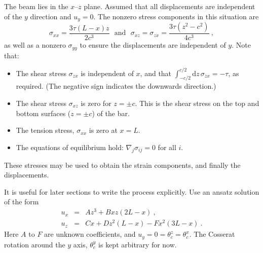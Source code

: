 \documentclass[]{scrreprt}
\begin{document}
The beam lies in the $x$--$z$ plane.  Assumed that all displacements
are independent of the $y$ direction and $u_{y}=0$.  The nonzero
stress components in this situation are
\begin{equation}
\sigma_{xx} = \frac{3\tau (L-x)z}{2c^{3}} \ \ \ \mbox{and}
\ \ \ \sigma_{xz} = \sigma_{zx} = \frac{3\tau(z^{2}-c^{2})}{4c^{3}} \ ,
\end{equation}
as well as a nonzero $\sigma_{yy}$ to ensure the displacements are
independent of $y$.  Note that:
\begin{itemize}
\item The shear stress $\sigma_{zx}$ is independent of $x$, and that
  $\int_{-c/2}^{c/2}\mathrm{d}z\, \sigma_{zx} = -\tau$, as required.
  (The negative sign indicates the downwards direction.)
\item The shear stress $\sigma_{xz}$ is zero for $z=\pm c$.  This is
  the shear stress on the top and bottom surfaces ($z=\pm c$) of the
  bar.
\item The tension stress, $\sigma_{xx}$ is zero at $x=L$.
\item The equations of equilibrium hold: $\nabla_{j}\sigma_{ij}=0$ for all $i$.
\end{itemize}
These stresses may be used to obtain the strain components, and
finally the displacements.

It is useful for later sections to write the process explicitly.
Use an ansatz solution of the form
\begin{eqnarray}
u_{x} & = & Az^{3} + Bxz(2L-x) \ , \\
u_{z} & = & Cx + Dz^{2}(L-x) - Fx^{2}(3L-x) \ .
\end{eqnarray}
Here $A$ to $F$ are unknown coefficients, and
$u_{y}=0=\theta_{c}^{z}=\theta_{c}^{x}$.  The Cosserat rotation around
the $y$ axis, $\theta_{c}^{y}$ is kept arbitrary for now.
\end{document}
